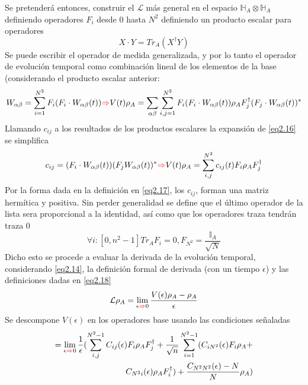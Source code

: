 \documentclass{book}
\begin{document}
Se pretenderá entonces, construir el $\mathcal{L}$ más general en el espacio $\mathbb{H}_A\otimes\mathbb{H}_A$ definiendo operadores $F_i$ desde $0$ hasta $N^2$ definiendo un producto escalar para operadores
\begin{equation}\label{eq2.15}  X\cdot Y=Tr_A(X^\dag Y)\end{equation}
Se puede escribir el operador de medida generalizada, y por lo tanto el operador de evolución temporal como combinación lineal de los elementos de la base (considerando el producto escalar anterior:
\begin{equation}\label{eq2.16}W_{\alpha\beta}=\sum_{i=1}^{N^2} F_i(F_i\cdot W_{\alpha\beta}(t))\textcolor{red}{\Rightarrow} V(t)\rho_A=\sum_{\alpha\beta}\sum_{i,j=1}^{N^2} F_i(F_i\cdot W_{\alpha\beta}(t))\rho_AF_j^\dag(F_j\cdot W_{\alpha\beta}(t))^*\end{equation}
Llamando $c_{ij}$ a los resultados de los productos escalares la expansión de \textcolor{blue}{\ref{eq2.16}} se simplifica
\begin{equation}\label{eq2.17}c_{ij}=(F_i\cdot W_{\alpha\beta}(t))(F_j W_{\alpha\beta}(t))^*\textcolor{red}{\Rightarrow} V(t)\rho_A=\sum_{i,j}^{N^2}c_{ij}(t)F_i\rho_AF_j^\dag\end{equation}
Por la forma dada en la definición en \textcolor{blue}{\ref{eq2.17}}, los $c_{ij}$, forman una matriz hermítica y positiva.
Sin perder generalidad se define que el último operador de la lista sera proporcional a la identidad, así como que los operadores traza tendrán traza $0$
\begin{equation}\label{eq2.18}\forall i:[0,n^2-1] Tr_A F_i=0, F_{N^2}=\frac{\mathbb{I}_A}{\sqrt{N}}\end{equation}
Dicho esto se procede a evaluar la derivada de la evolución temporal, considerando \textcolor{blue}{\ref{eq2.14}}, la definición formal de derivada (con un tiempo $\epsilon$) y las definiciones dadas en \textcolor{blue}{\ref{eq2.18}}
\begin{equation}\label{eq2.19}\mathcal{L}\rho_A= \lim\limits_{\epsilon\textcolor{red}{\Rightarrow} 0}\frac{V(\epsilon)\rho_A-\rho_A}{\epsilon}\end{equation}
Se descompone $V(\epsilon)$ en los operadores base usando las condiciones señaladas
\begin{equation}\label{eq2.20}\begin{aligned}=\lim\limits_{\epsilon\textcolor{red}{\Rightarrow} 0}\frac{1}{\epsilon}(\sum_{i,j}^{N^2-1} C_{ij}(\epsilon)F_i\rho_AF_j^\dag+\frac{1}{\sqrt{n}}\sum_{i=1}^{N^2-1}(C_{iN^2}(\epsilon)F_i\rho_A+\\ C_{N^2i}(\epsilon)\rho_AF_i^\dag)+\frac{C_{N^2N^2}(\epsilon)-N}{N}\rho_A)\end{aligned}\end{equation}
\end{document}
